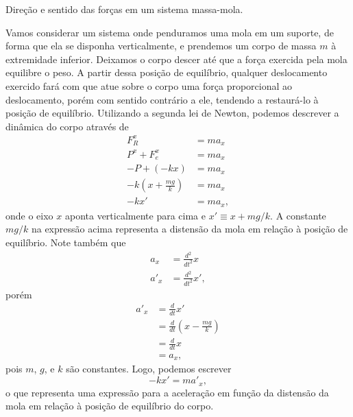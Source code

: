 \begin{marginfigure}
\centering
{}
\caption{Direção e sentido das forças em um sistema massa-mola.\label{Fig:BlocoEquilDevidoForcaElastica}}
\end{marginfigure}

Vamos considerar um sistema onde penduramos uma mola em um suporte, de forma que ela se disponha verticalmente, e prendemos um corpo de massa $m$ à extremidade inferior. Deixamos o corpo descer até que a força exercida pela mola equilibre o peso. A partir dessa posição de equilíbrio, qualquer deslocamento exercido fará com que atue sobre o corpo uma força proporcional ao deslocamento, porém com sentido contrário a ele, tendendo a restaurá-lo à posição de equilíbrio. Utilizando a segunda lei de Newton, podemos descrever a dinâmica do corpo através de
\begin{align}
    F_R^x &= m a_x \\
	P^x + F_e^x &= ma_x \\
	-P + (-kx) &= m a_x \\
	-k \left(x + \frac{mg}{k}\right) &= ma_x \\
	-kx' &= ma_x,
\end{align}
%
onde o eixo $x$ aponta verticalmente para cima e $x' \equiv x + mg/k$. A constante $mg/k$ na expressão acima representa a distensão da mola em relação à posição de equilíbrio. Note também que
\begin{align}
    a_x &= \frac{d^2}{dt^2}x \\
    a'_x &= \frac{d^2}{dt^2}x',
\end{align}
%
porém
\begin{align}
    a'_x &= \frac{d}{dt} x' \\
    &= \frac{d}{dt} \left(x - \frac{mg}{k}\right) \\
    &= \frac{d}{dt}x \\
    &= a_x,
\end{align}
%
pois $m$, $g$, e $k$ são constantes. Logo, podemos escrever
\begin{equation}
    -kx' = m a'_x,
\end{equation}
%
o que representa uma expressão para a aceleração em função da distensão da mola em relação à posição de equilíbrio do corpo.

